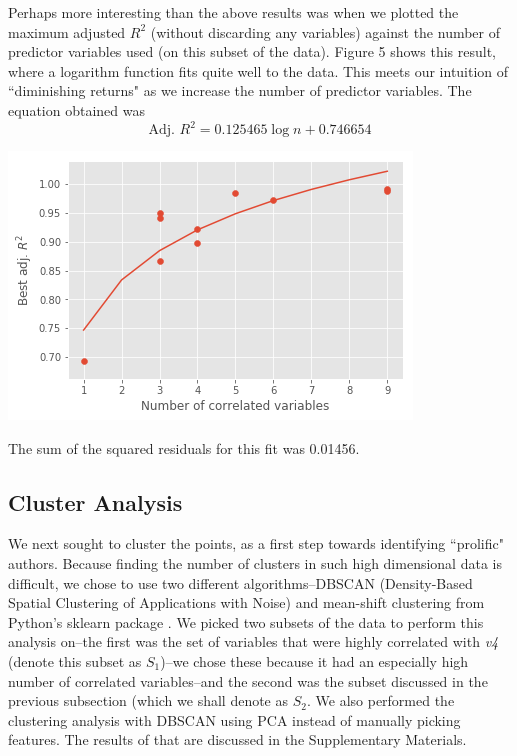 \documentclass[12pt,a4paper,twocolumn]{article}
\begin{document}
	Perhaps more interesting than the above results was when we plotted the maximum adjusted $R^2$ (without discarding any variables) against the number of predictor variables used (on this subset of the data). Figure 5 shows this result, where a logarithm function fits quite well to the data. This meets our intuition of ``diminishing returns" as we increase the number of predictor variables. The equation obtained was
	\begin{equation}
	\text{Adj. } R^2 = 0.125465 \log n + 0.746654
	\end{equation}
	
	\includegraphics[scale=0.5]{fig5.png}
	\begingroup
	\endgroup
	\hfill\break
	
	The sum of the squared residuals for this fit was 0.01456.
	
	\subsection{Cluster Analysis}
	We next sought to cluster the points, as a first step towards identifying ``prolific" authors. Because finding the number of clusters in such high dimensional data is difficult, we chose to use two different algorithms--DBSCAN (Density-Based Spatial Clustering of Applications with Noise)\cite{ester1996density} and mean-shift clustering \cite{comaniciu2002mean} from Python's sklearn package \cite{scikit-learn}. We picked two subsets of the data to perform this analysis on--the first was the set of variables that were highly correlated with \textit{v4} (denote this subset as $S_1$)--we chose these because it had an especially high number of correlated variables--and the second was the subset discussed in the previous subsection (which we shall denote as $S_2$. We also performed the clustering analysis with DBSCAN using PCA instead of manually picking features. The results of that are discussed in the Supplementary Materials.
	
\end{document}
